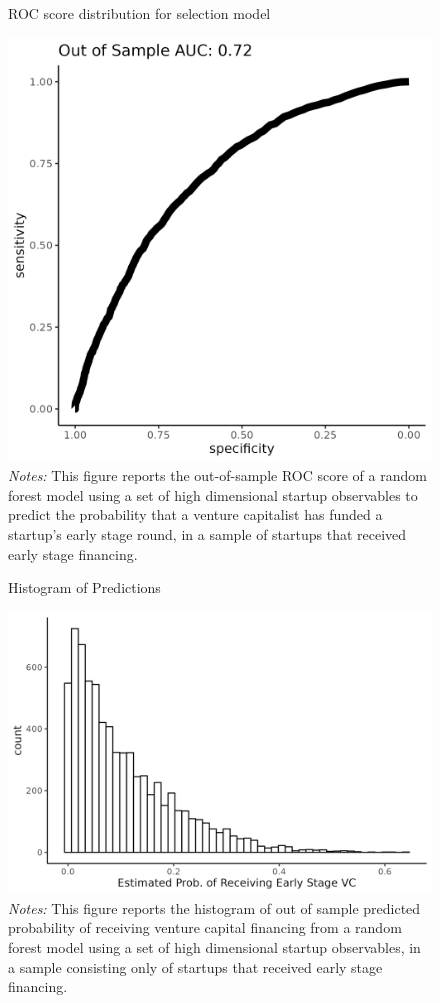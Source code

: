 \documentclass[11pt]{article}
\begin{document}
\begin{center}

\begin{figure}
 \center
  \caption{ROC score distribution for selection model}
  \includegraphics[width=.4\textwidth]{roc_graph.png}
  \caption*{\footnotesize \emph{Notes:} This figure reports the out-of-sample ROC score of a random forest model using a set of high dimensional startup observables to predict the probability that a venture capitalist has funded a startup's early stage round, in a sample of startups that received early stage financing.}
\end{figure}

\begin{figure}
  \center
  \caption{Histogram of Predictions}
  \includegraphics[width=.8\textwidth]{pred_histogram.png}
    \caption*{\footnotesize \emph{Notes:} This figure reports the histogram of out of sample predicted probability of receiving venture capital financing from a random forest model using a set of high dimensional startup observables, in a sample consisting only of startups that received early stage financing.}
\end{figure}



\end{center}
\end{document}
